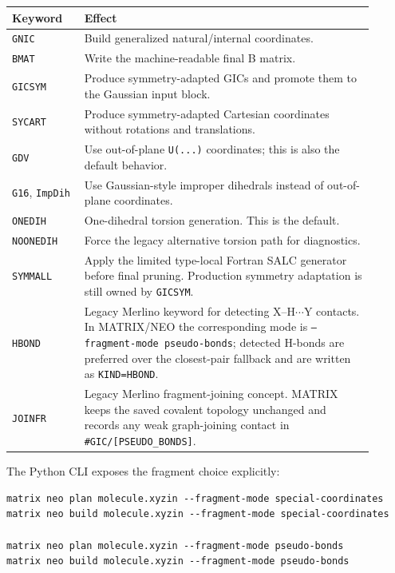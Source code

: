 \documentclass[11pt]{article}
\begin{document}
\begin{longtable}{@{}p{0.18\linewidth}p{0.72\linewidth}@{}}
\toprule
Keyword & Effect \\
\midrule
\endhead
\texttt{GNIC} & Build generalized natural/internal coordinates. \\
\texttt{BMAT} & Write the machine-readable final B matrix. \\
\texttt{GICSYM} & Produce symmetry-adapted GICs and promote them to the Gaussian
input block. \\
\texttt{SYCART} & Produce symmetry-adapted Cartesian coordinates without
rotations and translations. \\
\texttt{GDV} & Use out-of-plane \texttt{U(...)} coordinates; this is also the
default behavior. \\
\texttt{G16}, \texttt{ImpDih} & Use Gaussian-style improper dihedrals instead
of out-of-plane coordinates. \\
\texttt{ONEDIH} & One-dihedral torsion generation.  This is the default. \\
\texttt{NOONEDIH} & Force the legacy alternative torsion path for diagnostics. \\
\texttt{SYMMALL} & Apply the limited type-local Fortran SALC generator before
final pruning.  Production symmetry adaptation is still owned by
\texttt{GICSYM}. \\
\texttt{HBOND} & Legacy Merlino keyword for detecting X--H\(\cdots\)Y contacts.
In MATRIX/NEO the corresponding mode is
\texttt{--fragment-mode pseudo-bonds}; detected H-bonds are preferred over the
closest-pair fallback and are written as \texttt{KIND=HBOND}. \\
\texttt{JOINFR} & Legacy Merlino fragment-joining concept.  MATRIX keeps the
saved covalent topology unchanged and records any weak graph-joining contact in
\texttt{\#GIC/[PSEUDO\_BONDS]}. \\
\bottomrule
\end{longtable}

\noindent
The Python CLI exposes the fragment choice explicitly:

\begin{lstlisting}[style=oracle]
matrix neo plan molecule.xyzin --fragment-mode special-coordinates
matrix neo build molecule.xyzin --fragment-mode special-coordinates

matrix neo plan molecule.xyzin --fragment-mode pseudo-bonds
matrix neo build molecule.xyzin --fragment-mode pseudo-bonds
\end{lstlisting}
\end{document}
